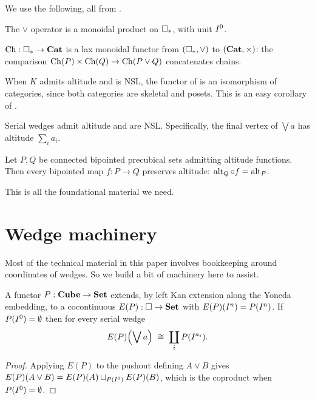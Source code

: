 \documentclass[11pt]{article}
\begin{document}
We use the following, all from \cite{PZ}.

\begin{lemma}[{\cite[\S2]{PZ}}]\label{lem:wedge-monoidal}
  The $\vee$ operator is a monoidal product on $\square_{*}$, with unit $I^{0}$.
\end{lemma}

\begin{lemma}\label{lem:ch-lax}
  $\operatorname{Ch} : \square_{*} \to \mathbf{Cat}$ is a lax monoidal functor from $(\square_{*}, \vee)$ to $(\mathbf{Cat}, \times)$: the
  comparison $\operatorname{Ch}(P) \times \operatorname{Ch}(Q) \to \operatorname{Ch}(P \vee Q)$ concatenates chains.
\end{lemma}

\begin{lemma}\label{lem:ch-NSL}
  When $K$ admits altitude and is NSL, the functor of  is an isomorphism of categories,
  since both categories are skeletal and posets.
  This is an easy corollary of {\cite[Lem.~2.11]{PZ}}.
\end{lemma}


\begin{lemma}\label{lem:wedges-nice}
  Serial wedges admit altitude and are NSL. Specifically, the
  final vertex of $\bigvee a$ has altitude $\sum_i a_i$.
\end{lemma}

\begin{lemma}[{\cite[Prop.~2.7]{PZ}}]\label{lem:alt-preserved}
  Let $P, Q$ be connected bipointed precubical sets admitting altitude functions. Then every
  bipointed map $f : P \to Q$ preserves altitude: $\operatorname{alt}_Q \circ f = \operatorname{alt}_P$.
\end{lemma}

This is all the foundational material we need.

\section{Wedge machinery}\label{sec:wedge}
Most of the technical material in this paper involves bookkeeping around coordinates of wedges.
So we build a bit of machinery here to assist.
\begin{lemma}\label{lem:kan-left}
  A functor $P : \mathbf{Cube} \to \mathbf{Set}$ extends, by left Kan extension along the Yoneda embedding,
  to a cocontinuous $E(P) : \square \to \mathbf{Set}$ with $E(P)(I^{n}) = P(I^{n})$. 
  If $P(I^{0}) = \emptyset$ then for every serial wedge
  \begin{equation}\label{eq:kan-left}
    E(P)\Bigl(\bigvee a\Bigr) \;\cong\; \coprod_i P(I^{a_i}).
  \end{equation}
\end{lemma}
\begin{proof}
  Applying $E(P)$ to the pushout defining $A \vee B$ gives
  $E(P)(A \vee B) = E(P)(A) \sqcup_{P(I^{0})} E(P)(B)$, which is the coproduct when
  $P(I^{0}) = \emptyset$.
\end{proof}
\end{document}
